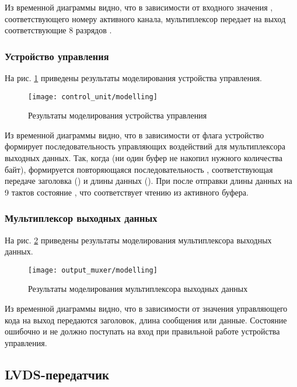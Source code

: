 Из временной диаграммы видно, что в зависимости от входного значения , соответствующего номеру активного канала, мультиплексор передает на выход соответствующие 8 разрядов .

\subsubsection{Устройство управления}

На рис. \ref{fig:control_unit_modelling} приведены результаты моделирования устройства управления.
\begin{figure}[H]
	\centering
	\texttt{[image: control\_unit/modelling]}
	\caption{Результаты моделирования устройства управления}
	\label{fig:control_unit_modelling}
\end{figure}

Из временной диаграммы видно, что в зависимости от флага  устройство формирует последовательность управляющих воздействий для мультиплексора выходных данных. Так, когда  (ни один буфер не накопил нужного количества байт), формируется повторяющаяся последовательность , соответствующая передаче заголовка () и длины данных (). При  после отправки длины данных на 9 тактов состояние , что соответствует чтению из активного буфера.

\subsubsection{Мультиплексор выходных данных}

На рис. \ref{fig:output_muxer_modelling} приведены результаты моделирования мультиплексора выходных данных.
\begin{figure}[H]
	\centering
	\texttt{[image: output\_muxer/modelling]}
	\caption{Результаты моделирования мультиплексора выходных данных}
	\label{fig:output_muxer_modelling}
\end{figure}

Из временной диаграммы видно, что в зависимости от значения управляющего кода  на выход передаются заголовок, длина сообщения или данные. Состояние  ошибочно и не должно поступать на вход при правильной работе устройства управления.

\subsection{LVDS-передатчик}

